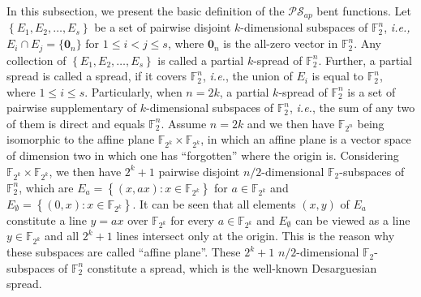 \documentclass{article}
\newcommand{\F}{\mathbb{F}}
\newcommand{\0}{\textbf{0}}
\newcommand{\1}{\textbf{1}}
\theoremstyle{plain}
\begin{document}
In this subsection, we present the basic definition of the $\mathcal{PS}_{ap}$ bent functions.
Let $\left\{ E_1,E_2,\dots,E_s \right\}$ be a set of pairwise disjoint $k$-dimensional subspaces of $\F_2^n$, {\em i.e.,}
$E_i\cap E_j = \{\bm{0}_n\}$ for $1\le i<j\le s$, where $\bm{0}_n$ is the all-zero vector in $\F_2^n$.
Any collection of $\left\{ E_1,E_2,\dots,E_s \right\}$ is called a partial $k$-spread of $\F_2^n$.
Further, a partial spread is called a spread, if it covers $\F_2^n$, \emph{i.e.}, the union of $E_i$ is equal to $\F_2^n$, where $1\le i\le s$.
Particularly, when $n=2k$, a partial $k$-spread of $\F_2^n$ is a set of pairwise supplementary of $k$-dimensional subspaces of $\F_2^n$,
\emph{i.e.},  the sum of any two of them is direct and equals $\F_2^n$.
Assume $n=2k$ and we then have $\F_{2^n}$ being isomorphic to the affine plane $\F_{2^k}\times\F_{2^k}$,
in which  an affine plane is a vector space of dimension two in which one has ``forgotten'' where the origin is.
Considering $\F_{2^k}\times\F_{2^k}$, we then have $2^k+1$ pairwise disjoint $n/2$-dimensional $\F_2$-subspaces of $\F_2^n$, which are
$E_a=\left\{(x,ax) : x\in\F_{2^k}\right\}$ for $a\in\F_{2^k}$ and $E_{\emptyset}=\left\{(0,x) : x\in\F_{2^k}\right\}$.
It can be seen that all elements $(x,y)$ of $E_a$ constitute a line $y=ax$ over $\F_{2^k}$ for every $a\in\F_{2^k}$ and 
$E_{\emptyset}$ can be viewed as a line $y\in\F_{2^k}$ and all $2^k+1$ lines intersect only at the origin. 
This is the reason why these subspaces are called ``affine plane''.
These $2^k+1$ $n/2$-dimensional $\F_2$-subspaces of $\F_2^n$ constitute a spread, which is the well-known Desarguesian spread.
\end{document}
